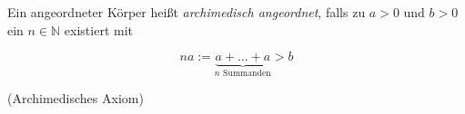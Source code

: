 Ein angeordneter Körper heißt \textit{archimedisch angeordnet}, falls zu $a > 0$ und $b > 0$ ein $n \in \mathbb{N}$ existiert mit

$$na := \underbrace{a+\dots+a}_{\text{$n$ Summanden}} > b$$

(Archimedisches Axiom)